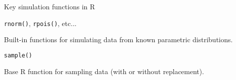 \begin{frame}{Key simulation functions in R}


\begin{block}{{\tt rnorm()}, {\tt rpois()}, etc...}

Built-in functions for simulating data from known parametric distributions.

\end{block}


\begin{block}{{\tt sample()}}

Base R function for sampling data (with or without replacement).



\end{block}


\end{frame}

